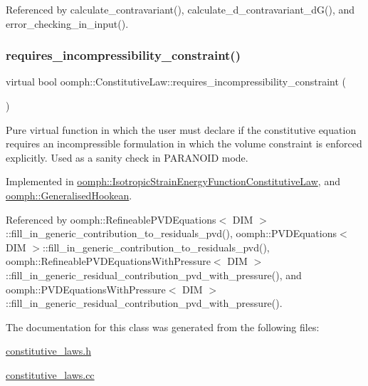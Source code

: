 Referenced by calculate\+\_\+contravariant(), calculate\+\_\+d\+\_\+contravariant\+\_\+d\+G(), and error\+\_\+checking\+\_\+in\+\_\+input().

\mbox{\label{classoomph_1_1ConstitutiveLaw_a446452158a8ae9fbc3dde4277155f824}} 
\subsubsection{\texorpdfstring{requires\+\_\+incompressibility\+\_\+constraint()}{requires\_incompressibility\_constraint()}}
{\footnotesize\ttfamily virtual bool oomph\+::\+Constitutive\+Law\+::requires\+\_\+incompressibility\+\_\+constraint (\begin{DoxyParamCaption}{ }\end{DoxyParamCaption})\hspace{0.3cm}{\ttfamily [pure virtual]}}



Pure virtual function in which the user must declare if the constitutive equation requires an incompressible formulation in which the volume constraint is enforced explicitly. Used as a sanity check in P\+A\+R\+A\+N\+O\+ID mode. 



Implemented in \hyperlink{classoomph_1_1IsotropicStrainEnergyFunctionConstitutiveLaw_a6b9a454988b023a42782f78e4e3eebc4}{oomph\+::\+Isotropic\+Strain\+Energy\+Function\+Constitutive\+Law}, and \hyperlink{classoomph_1_1GeneralisedHookean_a9ed467d8b7c838cb7fed8c861aa652e9}{oomph\+::\+Generalised\+Hookean}.



Referenced by oomph\+::\+Refineable\+P\+V\+D\+Equations$<$ D\+I\+M $>$\+::fill\+\_\+in\+\_\+generic\+\_\+contribution\+\_\+to\+\_\+residuals\+\_\+pvd(), oomph\+::\+P\+V\+D\+Equations$<$ D\+I\+M $>$\+::fill\+\_\+in\+\_\+generic\+\_\+contribution\+\_\+to\+\_\+residuals\+\_\+pvd(), oomph\+::\+Refineable\+P\+V\+D\+Equations\+With\+Pressure$<$ D\+I\+M $>$\+::fill\+\_\+in\+\_\+generic\+\_\+residual\+\_\+contribution\+\_\+pvd\+\_\+with\+\_\+pressure(), and oomph\+::\+P\+V\+D\+Equations\+With\+Pressure$<$ D\+I\+M $>$\+::fill\+\_\+in\+\_\+generic\+\_\+residual\+\_\+contribution\+\_\+pvd\+\_\+with\+\_\+pressure().



The documentation for this class was generated from the following files\+:\begin{DoxyCompactItemize}
\item 
\hyperlink{constitutive__laws_8h}{constitutive\+\_\+laws.\+h}\item 
\hyperlink{constitutive__laws_8cc}{constitutive\+\_\+laws.\+cc}\end{DoxyCompactItemize}
